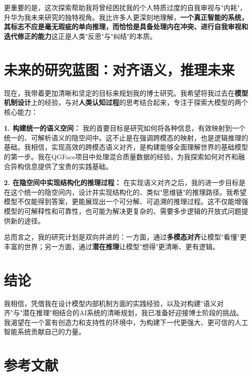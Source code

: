 \documentclass[11pt, letterpaper]{article}
\begin{document}
更重要的是，这次探索帮助我将曾经困扰我的个人特质过度的自我审视与"内耗"，升华为我未来研究的独特视角。我比许多人更深刻地理解，\textbf{一个真正智能的系统，其标志不应是毫无瑕疵的单向推理，而恰恰是具备处理内在冲突、进行自我审视和迭代修正的能力}这正是人类"反思"与"纠结"的本质。

\section{未来的研究蓝图：对齐语义，推理未来}

现在，我带着更加清晰和坚定的目标来规划我的博士研究。我希望将我过去在\textbf{模型机制设计}上的经验，与对\textbf{人类认知过程}的思考结合起来，专注于探索大模型的两个核心能力：

\textbf{1. 构建统一的语义空间：} 我的首要目标是研究如何将各种信息，有效映射到一个统一的、可解析语义的隐空间中。这不止是在强调跨模态的映射，也是逻辑推理的基础。我相信，实现高效的跨模态语义对齐，是构建能够全面理解世界的基础模型的第一步。我在QGFace项目中处理混合质量数据的经验，为我探索如何对齐和融合异构信息提供了宝贵的实践基础。

\textbf{2. 在隐空间中实现结构化的推理过程：} 在实现语义对齐之后，我的进一步目标是在这个统一的隐空间内，设计并实现结构化的、类似"思维链"的推理路径。我希望模型不仅能得到答案，更能展现出一个可分解、可追溯的推理过程。这不仅能增强模型的可解释性和可靠性，也可能为解决更复杂的、需要多步逻辑的开放式问题提供新的途径。

总而言之，我的研究计划是双向并进的：一方面，通过\textbf{多模态对齐}让模型"看懂"更丰富的世界；另一方面，通过\textbf{潜在推理}让模型"想得"更清晰、更有逻辑。

\section{结论}

我相信，凭借我在设计模型内部机制方面的实践经验，以及对构建"语义对齐"与"潜在推理"相结合的AI系统的清晰规划，我已准备好迎接博士阶段的挑战。我渴望在一个富有创造力和支持性的环境中，为构建下一代更强大、更可信的人工智能系统贡献自己的力量。

\section*{参考文献}


\end{document}
